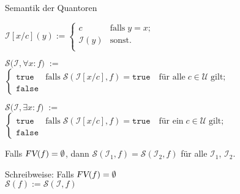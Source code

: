 \documentclass{slides}
\newcommand{\struct}{\mathcal{S}}
\newcommand{\FV}{\textsl{FV}}
\begin{document}

\begin{slide}{}
\normalsize
\begin{center}
Semantik der Quantoren
\end{center}
\vspace{0.5cm}

\footnotesize
\hspace*{1.3cm} 
    $\mathcal{I}[x/c](y) := \left\{
    \begin{array}{ll}
    c               & \mbox{falls}\; y = x;  \\
    \mathcal{I}(y)  & \mbox{sonst}.          \\
    \end{array}
    \right.$

 $\struct\bigl(\mathcal{I}, \forall x \!:\! f\bigr) \;:=\; $ \\[0.3cm]
 \hspace*{1.3cm} $\left\{
       \begin{array}{ll}
       \mathtt{true}  & \mbox{falls}\; \struct(\mathcal{I}[x/c], f) = \mathtt{true}\quad \mbox{für alle}\; c\in \mathcal{U}\;\mbox{gilt}; \\
       \mathtt{false} %
       \end{array}
       \right.$
\vspace{0.5cm}

 $\struct\bigl(\mathcal{I}, \exists x\!:\! f\bigr) \;:=\; $ \\[0.3cm]
 \hspace*{1.3cm} $\left\{
       \begin{array}{ll}
       \mathtt{true}  & \mbox{falls}\; \struct(\mathcal{I}[x/c], f) = \mathtt{true}\quad \mbox{für ein}\; c\in \mathcal{U}\;\mbox{gilt}; \\
       \mathtt{false} %
       \end{array}
       \right.$ 
\vspace{0.5cm}

Falls $\FV(f) = \emptyset$, dann $\mathcal{S}(\mathcal{I}_1, f) = \mathcal{S}(\mathcal{I}_2, f)$ 
für alle $\mathcal{I}_1$, $\mathcal{I}_2$.

Schreibweise: Falls $\FV(f) = \emptyset$ \\[0.1cm]
\hspace*{1.3cm} $\mathcal{S}(f) := \mathcal{S}(\mathcal{I}, f)$
\vspace{0.5cm}


\end{slide}
\end{document}
